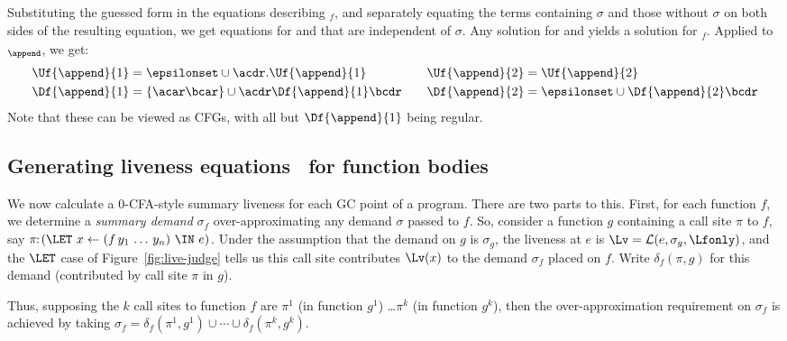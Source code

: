 \documentclass{llncs}
\begin{document}
Substituting  the  guessed   form  in  the  equations  describing
\Lfonly$_{\mathit   f}$,  and   separately  equating   the  terms
containing $\sigma$ and those  without $\sigma$ on both sides of the
resulting equation, we
get equations for  and  that are independent of
$\sigma$.  Any solution for    and   yields  a
solution for  \Lfonly$_{\mathit f}$. Applied  to \Lfonly$_{\mathit
  \append}$, we get:
  \begin{align*}
    \Uf{\append}{1} &= \epsilonset
    \cup \acdr.\Uf{\append}{1}  
    &\quad 
    \Uf{\append}{2} &= \Uf{\append}{2} \\
    \Df{\append}{1} &= \lbrace\acar\bcar\rbrace 
    \cup \acdr\Df{\append}{1}\bcdr &\quad 
    \Df{\append}{2} &= \epsilonset \cup
    \Df{\append}{2}\bcdr 
  \end{align*}
Note that these can be viewed as CFGs, with all but $\Df{\append}{1}$ being regular.

\subsection{Generating liveness equations \Lv\  for function bodies}
\label{sec:bodylivenessbodies}

\newcommand{\deltacall}[3]{\delta_{#1}({#2},{#3})}

We now calculate a 0-CFA-style summary liveness for each GC point of a program.
There are two parts to this.
First, for each function $f$,  we determine a {\em summary demand} $\sigma_f$
over-approximating any demand $\sigma$ passed to $f$.
So, consider a function $g$ containing a call site $\pi$ to $f$, say
$\pi\!\!:\!(\LET~x \leftarrow (f\,y_1\,\ldots\,y_n)~\IN~e)$.
Under the assumption that the demand on $g$ is $\sigma_g$, the liveness at $e$
is $\Lv = \mathcal{L}(e,\sigma_g,\Lfonly)$, and the $\LET$ case of
Figure~\ref{fig:live-judge} tells us this call site contributes $\Lv(x)$ to the
demand $\sigma_f$ placed on  $f$.
Write $\deltacall{f}{\pi}{g}$ for
this demand (contributed by call site $\pi$ in $g$).

Thus, supposing the $k$ call sites to function $f$ are
$\pi^1$ (in function $g^1$) \ldots $\pi^k$ (in function $g^k$),
then the over-approximation requirement on $\sigma_f$
is achieved by taking $\sigma_f = \deltacall{f}{\pi^1}{g^1} \cup \cdots \cup \deltacall{f}{\pi^k}{g^k}$.
\end{document}
